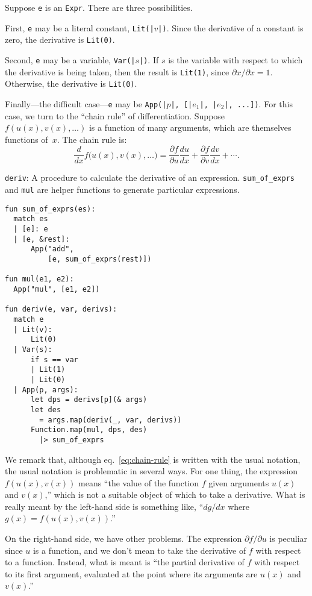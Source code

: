 \documentclass[11pt, a4paper]{article}
\newcommand{\cd}[1]{\texttt{#1}}
\begin{document}
Suppose \cd{e} is an \cd{Expr}. There are three possibilities.

First, \cd{e} may be a literal constant, \cd{Lit(|$v$|)}. Since the
derivative of a constant is zero, the derivative is \cd{Lit(0)}.

Second, \cd{e} may be a variable, \cd{Var(|$s$|)}. If $s$ is the
variable with respect to which the derivative is being taken, then the
result is \cd{Lit(1)}, since $\partial x/\partial x = 1$. Otherwise, the derivative
is \cd{Lit(0)}.

Finally---the difficult case---\cd{e} may be \cd{App(|$p$|, [|$e_1$|,
  |$e_2$|, ...])}. For this case, we turn to the ``chain rule'' of
differentiation. Suppose $f(u(x), v(x), \dots)$ is a function of many
arguments, which are themselves functions of~$x$. The chain rule is:
\begin{equation}\label{eq:chain-rule}
  \frac{d}{dx}f\bigl(u(x), v(x), \dotsc\bigr) =
  \frac{\partial f}{\partial u} \frac{du}{dx} 
  + \frac{\partial f}{\partial v}\frac{dv}{dx}
  + \dotsb. 
\end{equation}

\begin{marginfigure}
  \caption{\cd{deriv}: A procedure to calculate the derivative of an
    expression. \cd{sum_of_exprs} and \cd{mul} are helper functions to
    generate particular expressions.\label{fig:deriv}}
  \footnotesize%
\begin{verbatim}
fun sum_of_exprs(es):
  match es
  | [e]: e
  | [e, &rest]:
      App("add",
          [e, sum_of_exprs(rest)])

fun mul(e1, e2):
  App("mul", [e1, e2])

fun deriv(e, var, derivs):
  match e
  | Lit(v):
      Lit(0)
  | Var(s):
      if s == var
      | Lit(1)
      | Lit(0)
  | App(p, args):
      let dps = derivs[p](& args)
      let des
        = args.map(deriv(_, var, derivs))
      Function.map(mul, dps, des)
        |> sum_of_exprs 
\end{verbatim}
\end{marginfigure}
We remark that, although eq.~\eqref{eq:chain-rule} is written with the
usual notation, the usual notation is problematic in several ways. For
one thing, the expression $f(u(x), v(x))$ means ``the value of the
function $f$ given arguments $u(x)$ and $v(x)$,'' which is not a
suitable object of which to take a derivative. What is really meant by
the left-hand side is something like, ``$dg/dx$ where
$g(x) = f(u(x),v(x))$.''

On the right-hand side, we have other problems. The expression
$\partial f/\partial u$ is peculiar since $u$ is a function, and we don't mean to
take the derivative of $f$ with respect to a function. Instead, what
is meant is ``the partial derivative of $f$ with respect to its first
argument, evaluated at the point where its arguments are $u(x)$
and~$v(x)$.''
\end{document}
